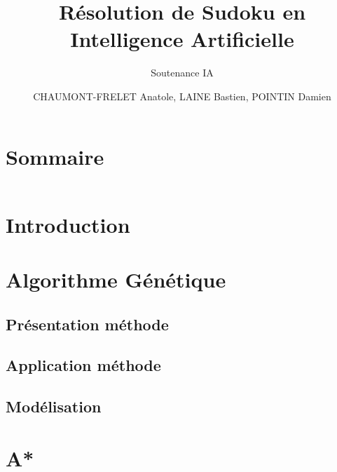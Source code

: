 \documentclass{beamer}
\title{Résolution de Sudoku en Intelligence Artificielle}
\subtitle{Soutenance IA}
\author{CHAUMONT-FRELET Anatole, LAINE Bastien, POINTIN Damien}
\institute{Génie Mathématique | INSA Rouen}
\begin{document}
    \beamertemplatenavigationsymbolsempty

    \begin{frame}
        \titlepage{}
    \end{frame}

    \section*{Sommaire}
        \begin{frame}
            \begin{columns}[t]
  				\begin{column}{5cm}
  					\tableofcontents[sections={1-4}]
  				\end{column}
  				\begin{column}{5cm}
  					\tableofcontents[sections={5-8}]
  				\end{column}
  			\end{columns}
        \end{frame}

    \section{Introduction}
        \subsection{ }
            

    \section{Algorithme Génétique}
        \subsection{Présentation méthode}
	        
	    \subsection{Application méthode}
        	
        \subsection{Modélisation}
        	
    
    \section{A*}
\end{document}
